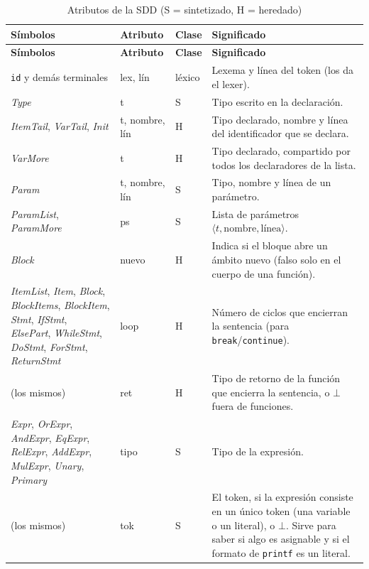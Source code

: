 \documentclass[11pt]{article}
\newcommand{\NT}[1]{\textcolor{ntcolor}{\textit{#1}}}            %
\newcommand{\T}[1]{\textcolor{tcolor}{\texttt{#1}}}              %
\begin{document}
\begin{longtable}{@{}>{\raggedright\arraybackslash}p{4.6cm}>{\raggedright\arraybackslash}p{1.8cm}p{1.3cm}>{\raggedright\arraybackslash}p{7.6cm}@{}}
\caption{Atributos de la SDD (S = sintetizado, H = heredado)}\\
\toprule
\textbf{Símbolos} & \textbf{Atributo} & \textbf{Clase} & \textbf{Significado} \\
\midrule
\endfirsthead
\toprule
\textbf{Símbolos} & \textbf{Atributo} & \textbf{Clase} & \textbf{Significado} \\
\midrule
\endhead
\bottomrule
\endfoot
\T{id} y demás terminales & \textsf{lex}, \textsf{lín} & léxico & Lexema y línea del token (los da el lexer). \\
\NT{Type} & \textsf{t} & S & Tipo escrito en la declaración. \\
\NT{ItemTail}, \NT{VarTail}, \NT{Init} & \textsf{t}, \textsf{nombre}, \textsf{lín} & H & Tipo declarado, nombre y línea del identificador que se declara. \\
\NT{VarMore} & \textsf{t} & H & Tipo declarado, compartido por todos los declaradores de la lista. \\
\NT{Param} & \textsf{t}, \textsf{nombre}, \textsf{lín} & S & Tipo, nombre y línea de un parámetro. \\
\NT{ParamList}, \NT{ParamMore} & \textsf{ps} & S & Lista de parámetros $\langle t, \text{nombre}, \text{línea}\rangle$. \\
\NT{Block} & \textsf{nuevo} & H & Indica si el bloque abre un ámbito nuevo (\textsf{falso} solo en el cuerpo de una función). \\
\NT{ItemList}, \NT{Item}, \NT{Block}, \NT{BlockItems}, \NT{BlockItem}, \NT{Stmt}, \NT{IfStmt}, \NT{ElsePart}, \NT{WhileStmt}, \NT{DoStmt}, \NT{ForStmt}, \NT{ReturnStmt} & \textsf{loop} & H & Número de ciclos que encierran la sentencia (para \T{break}/\T{continue}). \\
(los mismos) & \textsf{ret} & H & Tipo de retorno de la función que encierra la sentencia, o $\bot$ fuera de funciones. \\
\NT{Expr}, \NT{OrExpr}, \NT{AndExpr}, \NT{EqExpr}, \NT{RelExpr}, \NT{AddExpr}, \NT{MulExpr}, \NT{Unary}, \NT{Primary} & \textsf{tipo} & S & Tipo de la expresión. \\
(los mismos) & \textsf{tok} & S & El token, si la expresión consiste en un único token (una variable o un literal), o $\bot$. Sirve para saber si algo es asignable y si el formato de \T{printf} es un literal. \\

\end{longtable}
\end{document}

